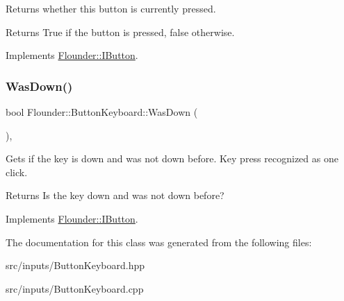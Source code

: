 Returns whether this button is currently pressed. 

\begin{DoxyReturn}{Returns}
True if the button is pressed, false otherwise. 
\end{DoxyReturn}


Implements \hyperlink{class_flounder_1_1_i_button_a264519250d835422748bcc1af9be38e3}{Flounder\+::\+I\+Button}.

\mbox{\label{class_flounder_1_1_button_keyboard_a67f15c721a2e7afdf6594c6912a8e664}} 
\subsubsection{\texorpdfstring{Was\+Down()}{WasDown()}}
{\footnotesize\ttfamily bool Flounder\+::\+Button\+Keyboard\+::\+Was\+Down (\begin{DoxyParamCaption}{ }\end{DoxyParamCaption})\hspace{0.3cm}{\ttfamily [override]}, {\ttfamily [virtual]}}



Gets if the key is down and was not down before. Key press recognized as one click. 

\begin{DoxyReturn}{Returns}
Is the key down and was not down before? 
\end{DoxyReturn}


Implements \hyperlink{class_flounder_1_1_i_button_af31c7669349991fe6a57beb8bd42c5b2}{Flounder\+::\+I\+Button}.



The documentation for this class was generated from the following files\+:\begin{DoxyCompactItemize}
\item 
src/inputs/Button\+Keyboard.\+hpp\item 
src/inputs/Button\+Keyboard.\+cpp\end{DoxyCompactItemize}

